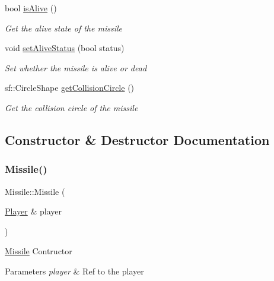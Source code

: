 \begin{DoxyCompactItemize}
bool \mbox{\hyperlink{class_missile_a66d42fcf18ac58c36a4fee4440d48435}{is\+Alive}} ()
\begin{DoxyCompactList}\small\item\em Get the alive state of the missile \end{DoxyCompactList}\item 
void \mbox{\hyperlink{class_missile_ad2b1a2c22fa692e1e91a52fec411704e}{set\+Alive\+Status}} (bool status)
\begin{DoxyCompactList}\small\item\em Set whether the missile is alive or dead \end{DoxyCompactList}\item 
sf\+::\+Circle\+Shape \mbox{\hyperlink{class_missile_a3e4feeb61af3c1a333f5d0efa8b5bda5}{get\+Collision\+Circle}} ()
\begin{DoxyCompactList}\small\item\em Get the collision circle of the missile \end{DoxyCompactList}\end{DoxyCompactItemize}


\subsection{Constructor \& Destructor Documentation}
\mbox{\label{class_missile_a69e2217677e4a23b74539f6a5a277bfb}} 
\subsubsection{\texorpdfstring{Missile()}{Missile()}}
{\footnotesize\ttfamily Missile\+::\+Missile (\begin{DoxyParamCaption}\item[{\mbox{\hyperlink{class_player}{Player}} \&}]{player }\end{DoxyParamCaption})}



\mbox{\hyperlink{class_missile}{Missile}} Contructor 


\begin{DoxyParams}{Parameters}
{\em player} & Ref to the player\\
\hline
\end{DoxyParams}
\mbox{\label{class_missile_ad42379e48a46ec3556056f98ce8bd912}} 
